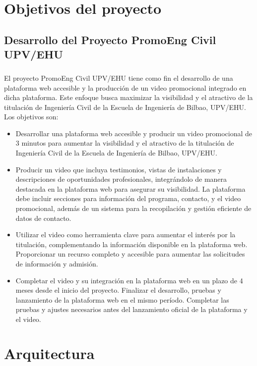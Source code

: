 \documentclass{report}
\begin{document}
    \chapter{Objetivos del proyecto}
        \section{Desarrollo del Proyecto PromoEng Civil UPV/EHU}
            \paragraph*{}
            El proyecto PromoEng Civil UPV/EHU tiene como fin el desarrollo de una plataforma web accesible y la producción de un video promocional integrado en dicha plataforma. Este enfoque busca maximizar la visibilidad y el atractivo de la titulación de Ingeniería Civil de la Escuela de Ingeniería de Bilbao, UPV/EHU. Los objetivos son:
            \begin{itemize}
                \item Desarrollar una plataforma web accesible y producir un video promocional de 3 minutos para aumentar la visibilidad y el atractivo de la titulación de Ingeniería Civil de la Escuela de Ingeniería de Bilbao, UPV/EHU.
                \item Producir un video que incluya testimonios, vistas de instalaciones y descripciones de oportunidades profesionales, integrándolo de manera destacada en la plataforma web para asegurar su visibilidad. La plataforma debe incluir secciones para información del programa, contacto, y el video promocional, además de un sistema para la recopilación y gestión eficiente de datos de contacto.
                \item Utilizar el video como herramienta clave para aumentar el interés por la titulación, complementando la información disponible en la plataforma web. Proporcionar un recurso completo y accesible para aumentar las solicitudes de información y admisión.
                \item Completar el video y su integración en la plataforma web en un plazo de 4 meses desde el inicio del proyecto. Finalizar el desarrollo, pruebas y lanzamiento de la plataforma web en el mismo período. Completar las pruebas y ajustes necesarios antes del lanzamiento oficial de la plataforma y el video.
            \end{itemize}
    \chapter{Arquitectura}
\end{document}
